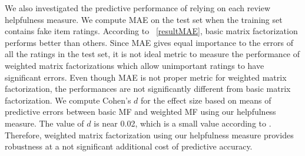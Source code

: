 \documentclass[master,english,final]{kaist-ucs}
\begin{document}
We also investigated the predictive performance of relying on each review helpfulness measure.
We compute MAE on the test set when the training set contains fake item ratings.
According to ~\ref{resultMAE}, basic matrix factorization performs better than others.
Since MAE gives equal importance to the errors of all the ratings in the test set, it is not ideal metric to measure the performance of weighted matrix factorizations which allow unimportant ratings to have significant errors.
Even though MAE is not proper metric for weighted matrix factorization, the performances are not significantly different from basic matrix factorization.
We compute Cohen's $d$ for the effect size based on means of predictive errors between basic MF and weighted MF using our helpfulness measure.
The value of $d$ is near 0.02, which is a small value according to \cite{EffectSize}.
Therefore, weighted matrix factorization using our helpfulness measure provides robustness at a not significant additional cost of predictive accuracy.


\end{document}
